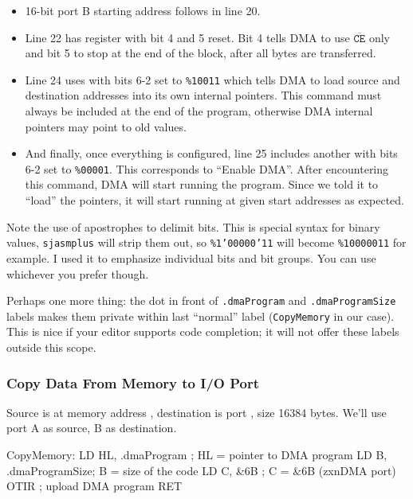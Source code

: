 {\begin{itemize}[topsep=1pt,itemsep=1pt]
	\item 16-bit port B starting address follows in line 20.
	
	\item Line 22 has  register with bit 4 and 5 reset. Bit 4 tells DMA to use $\mathtt{\overline{CE}}$ only and bit 5 to stop at the end of the block, after all bytes are transferred.
	
	\item Line 24 uses  with bits 6-2 set to {\tt \%10011} which tells DMA to load source and destination addresses into its own internal pointers. This command must always be included at the end of the program, otherwise DMA internal pointers may point to old values.
	
	\item And finally, once everything is configured, line 25 includes another  with bits 6-2 set to {\tt \%00001}. This corresponds to ``Enable DMA''. After encountering this command, DMA will start running the program. Since we told it to ``load'' the pointers, it will start running at given start addresses as expected.
\end{itemize}

Note the use of apostrophes to delimit bits. This is special syntax for binary values, {\tt sjasmplus} will strip them out, so {\tt \%1'00000'11} will become {\tt \%10000011} for example. I used it to emphasize individual bits and bit groups. You can use whichever you prefer though.

Perhaps one more thing: the dot in front of {\tt .dmaProgram} and {\tt .dmaProgramSize} labels makes them private within last ``normal'' label ({\tt CopyMemory} in our case). This is nice if your editor supports code completion; it will not offer these labels outside this scope.



\pagebreak
\subsubsection{Copy Data From Memory to I/O Port}

Source is at memory address , destination is port , size 16384 bytes. We'll use port A as source, B as destination.

\begin{tcblisting}{}
CopyMemory:
	LD HL, .dmaProgram     ; HL = pointer to DMA program
	LD B, .dmaProgramSize; B = size of the code
	LD C, &6B              ; C = &6B (zxnDMA port)
	OTIR                   ; upload DMA program
	RET


\end{tcblisting}}

